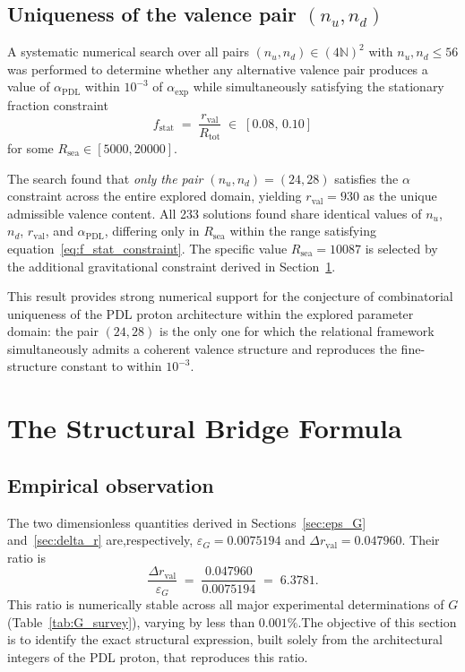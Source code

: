 \documentclass[11pt,a4paper]{article}
\newcommand{\PDL}{\mathrm{PDL}}
\begin{document}
\subsection{Uniqueness of the valence pair \texorpdfstring{$(n_u, n_d)$}{(nu, nd)}}
\label{sec:uniqueness}

A systematic numerical search over all pairs $(n_u, n_d) \in (4\mathbb{N})^2$ with $n_u, n_d \leq 56$ was performed to determine whether any alternative valence pair produces a value of $\alpha_{\PDL}$ within $10^{-3}$ of $\alpha_{\exp}$ while simultaneously satisfying the stationary fraction constraint
\begin{equation}
    f_{\mathrm{stat}} 
    \;=\; \frac{r_{\mathrm{val}}}{R_{\mathrm{tot}}} 
    \;\in\; [0.08,\, 0.10]
    \label{eq:f_stat_constraint}
\end{equation}
for some $R_{\mathrm{sea}} \in [5000, 20000]$. 

The search found that \emph{only the pair $(n_u, n_d) = (24, 28)$} satisfies the $\alpha$ constraint across the entire explored domain, yielding $r_{\mathrm{val}} = 930$ as the unique admissible valence content. All 233 solutions found share identical values of $n_u$, $n_d$, $r_{\mathrm{val}}$, and $\alpha_{\PDL}$, differing only in $R_{\mathrm{sea}}$ within the range satisfying equation~\eqref{eq:f_stat_constraint}. The specific value $R_{\mathrm{sea}} = 10087$ is selected by the additional gravitational constraint derived in Section~\ref{sec:bridge}.

This result provides strong numerical support for the conjecture of combinatorial uniqueness of the PDL proton architecture \cite{Combinatorial_Proton_v2_2026} within the explored parameter domain: the pair $(24, 28)$ is the only one for which the relational framework simultaneously admits a coherent valence structure and reproduces the fine-structure constant to 
within $10^{-3}$.


\section{The Structural Bridge Formula}
\label{sec:bridge}

\subsection{Empirical observation}

The two dimensionless quantities derived in Sections~\ref{sec:eps_G} and~\ref{sec:delta_r} are,respectively, $\varepsilon_G = 0.0075194$ and $\Delta r_{\mathrm{val}} = 0.047960$. Their ratio is
\begin{equation}
    \frac{\Delta r_{\mathrm{val}}}{\varepsilon_G}
    \;=\; \frac{0.047960}{0.0075194}
    \;=\; 6.3781.
    \label{eq:ratio_empirical}
\end{equation}
This ratio is numerically stable across all major experimental determinations of $G$ (Table~\ref{tab:G_survey}), varying by less than $0.001\%$.The objective of this section is to identify the exact structural expression, built solely from the architectural integers of the PDL proton, that reproduces this ratio.
\end{document}

